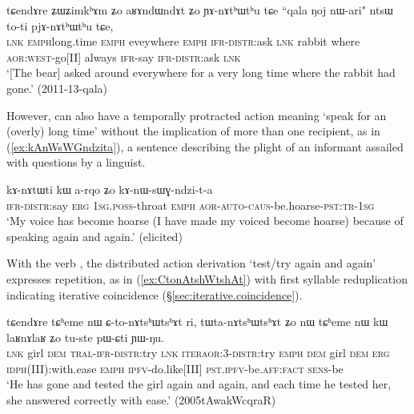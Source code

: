 \begin{exe}
\ex \label{ex:YAnAthWthu}
\gll tɕendɤre ʑɯ\redp{}ʑimkʰɤm ʑo aʁɤndɯndɤt ʑo ɲɤ-nɤtʰɯtʰu tɕe ``qala ŋoj nɯ-ari" ntsɯ to-ti pjɤ-nɤtʰɯtʰu tɕe, \\
\textsc{lnk} \textsc{emph}\redp{}long.time \textsc{emph} eveywhere \textsc{emph} \textsc{ifr}-\textsc{distr}:ask \textsc{lnk} rabbit where \textsc{aor}:\textsc{west}-go[II] always \textsc{ifr}-say \textsc{ifr}-\textsc{distr}:ask \textsc{lnk} \\
\glt `[The bear] asked around everywhere for a very long time where the rabbit had gone.' (2011-13-qala)
\end{exe}

However,  can also have a temporally protracted action meaning `speak for an (overly) long time' without the implication of more than one recipient, as in (\ref{ex:kAnWsWGndzita}), a sentence describing the plight of an informant assailed with questions by a linguist.

\begin{exe}
\ex \label{ex:kAnWsWGndzita}
\gll kɤ-nɤtɯti kɯ a-rqo ʑo kɤ-nɯ-sɯɣ-ndzi-t-a \\
\textsc{ifr}-\textsc{distr}:say \textsc{erg} \textsc{1sg}.\textsc{poss}-throat \textsc{emph} \textsc{aor}-\textsc{auto}-\textsc{caus}-be.hoarse-\textsc{pst}:\textsc{tr}-\textsc{1sg} \\
\glt `My voice has become hoarse (I have made my voiced become hoarse) because of speaking again and again.' (elicited)
\end{exe}

With the verb , the distributed action derivation  `test/try again and again' expresses repetition, as in (\ref{ex:CtonAtshWtshAt}) with first syllable reduplication indicating iterative coincidence (§\ref{sec:iterative.coincidence}).

\begin{exe}
\ex \label{ex:CtonAtshWtshAt}
\gll tɕendɤre tɕʰeme nɯ ɕ-to-nɤtsʰɯtsʰɤt ri, tɯ\redp{}ta-nɤtsʰɯtsʰɤt ʑo nɯ tɕʰeme nɯ kɯ laʁnɤlaʁ ʑo tu-ste pɯ-ɕti ɲɯ-ŋu. \\
\textsc{lnk} girl \textsc{dem} \textsc{tral}-\textsc{ifr}-\textsc{distr}:try \textsc{lnk} \textsc{iter}\redp{}\textsc{aor}:3\flobv{}-\textsc{distr}:try \textsc{emph} \textsc{dem} girl \textsc{dem} \textsc{erg} \textsc{idph}(III):with.ease \textsc{emph} \textsc{ipfv}-do.like[III] \textsc{pst}.\textsc{ipfv}-be.\textsc{aff}:\textsc{fact} \textsc{sens}-be \\
\glt `He has gone and tested the girl again and again, and each time he tested her, she answered correctly with ease.' (2005tAwakWcqraR)
\end{exe}

